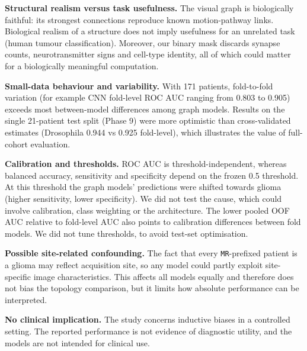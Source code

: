 \textbf{Structural realism versus task usefulness.} The visual graph is biologically faithful: its strongest connections reproduce known motion-pathway links. Biological realism of a structure does not imply usefulness for an unrelated task (human tumour classification). Moreover, our binary mask discards synapse counts, neurotransmitter signs and cell-type identity, all of which could matter for a biologically meaningful computation.

\textbf{Small-data behaviour and variability.} With 171 patients, fold-to-fold variation (for example CNN fold-level ROC AUC ranging from 0.803 to 0.905) exceeds most between-model differences among graph models. Results on the single 21-patient test split (Phase 9) were more optimistic than cross-validated estimates (Drosophila 0.944 vs 0.925 fold-level), which illustrates the value of full-cohort evaluation.

\textbf{Calibration and thresholds.} ROC AUC is threshold-independent, whereas balanced accuracy, sensitivity and specificity depend on the frozen 0.5 threshold. At this threshold the graph models' predictions were shifted towards glioma (higher sensitivity, lower specificity). We did not test the cause, which could involve calibration, class weighting or the architecture. The lower pooled OOF AUC relative to fold-level AUC also points to calibration differences between fold models. We did not tune thresholds, to avoid test-set optimisation.

\textbf{Possible site-related confounding.} The fact that every \texttt{MR}-prefixed patient is a glioma may reflect acquisition site, so any model could partly exploit site-specific image characteristics. This affects all models equally and therefore does not bias the topology comparison, but it limits how absolute performance can be interpreted.

\textbf{No clinical implication.} The study concerns inductive biases in a controlled setting. The reported performance is not evidence of diagnostic utility, and the models are not intended for clinical use.
